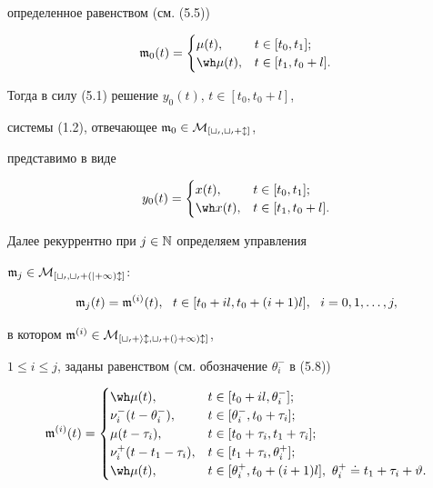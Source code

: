 определенное равенством (см. (5.5))


\begin{equation}


\frak m_0(t)= \begin{cases}


\mu(t), & t\in[t_0,t_1];\\


\wh\mu(t),& t\in[t_1,t_0+l].


\end{cases}


\end{equation}


Тогда в силу (5.1) решение $y_0(t)$, $t\in[t_0,t_0+l]$,


системы (1.2), отвечающее $\frak m_0\in\cal M_{[t_0,t_0+l]}$,


представимо в виде


\begin{equation}


y_0(t)=\begin{cases} x(t),& t\in[t_0,t_1];\\ \wh x(t),&


t\in[t_1,t_0+l].


\end{cases}


\end{equation}





Далее рекуррентно при $j\in\Bbb N$ определяем управления


$\frak m_j\in\cal M_{[t_0,t_0+(j+1)l]}$:


\begin{equation}


\frak m_j(t)=


\frak m^{(i)}(t),\ \ t\in[t_0+il,t_0+(i+1)l],\ \ i=0,1,\dotsc,j,


\end{equation}


в котором $\frak m^{(i)}\in\cal M_{[t_0+il,t_0+(i+1)l]}$,


$1\le i\le j$, заданы равенством (см. обозначение $\theta_i^{-}$ в (5.8))


\begin{equation}


\frak m^{(i)}(t)=\begin{cases}


\wh\mu(t), & t\in[t_0+il,\theta_i^{-}];\\


\nu_i^-(t-\theta_i^{-}), & t\in[\theta_i^{-},t_0+\tau_i];\\


\mu(t-\tau_i), & t\in[t_0+\tau_i,t_1+\tau_i];\\


\nu_i^+(t-t_1-\tau_i), & t\in[t_1+\tau_i,\theta_i^{+}]; \\


\wh\mu(t), & t\in[\theta_i^{+},t_0+(i+1)l],\ \theta_i^{+}


\doteq t_1+\tau_i+\vartheta.


\end{cases}


\end{equation}


